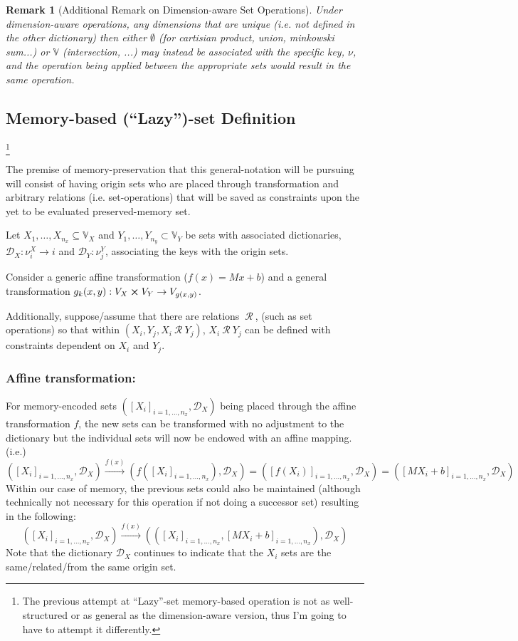 \documentclass[11pt]{article}
\newtheorem{remark}{Remark}
\newcommand{\Rel}{\ \mathcal{R} \ }
\newcommand{\V}{\mathbb{V}} %
\newcommand{\Key}{\nu} %
\newcommand{\Dict}{\mathcal{D}} %
\begin{document}
\begin{remark}[Additional Remark on Dimension-aware Set Operations]
	Under dimension-aware operations, any dimensions that are unique (i.e. not defined in the other dictionary) then either $\emptyset$ (for cartisian product, union, minkowski sum...) or $\V$ (intersection, ...) may instead be associated with the specific key, $\Key$, and the operation being applied between the appropriate sets would result in the same operation.
\end{remark}


\subsection{Memory-based (``Lazy'')-set Definition}
\footnote{The previous attempt at ``Lazy''-set memory-based operation is not as well-structured or as general as the dimension-aware version, thus I'm going to have to attempt it differently.}

The premise of memory-preservation that this general-notation will be pursuing will consist of having origin sets who are placed through transformation and arbitrary relations (i.e. set-operations) that will be saved as constraints upon the yet to be evaluated preserved-memory set.

Let $X_{1},\dots,X_{n_x} \subseteq \V_{X}$ and $Y_{1},\dots,Y_{n_y} \subset \V_{Y}$ be sets with associated dictionaries, $\Dict_{X} : \Key^{X}_{i} \to i$ and $\Dict_{Y} : \Key^{Y}_{j}$, associating the keys with the origin sets.

Consider a generic affine transformation ($f(x) = Mx + b$) and a general transformation $g_{k}(x,y) : V_{X} \cross V_{Y} \to V_{g(x,y)}$.

Additionally, suppose/assume that there are relations $\Rel$, (such as set operations) so that within $(X_{i}, Y_{j}, X_{i} \Rel Y_{j})$, $X_{i} \Rel Y_{j}$ can be defined with constraints dependent on $X_{i}$ and $Y_{j}$.

\subsubsection{Affine transformation:}
For memory-encoded sets $([X_{i}]_{i=1,\dots,n_x},\Dict_{X})$ being placed through the affine transformation $f$, the new sets can be transformed with no adjustment to the dictionary but the individual sets will now be endowed with an affine mapping.
(i.e.)\[
	([X_{i}]_{i=1,\dots,n_x},\Dict_{X}) 
	\overset{f(x)}{\rightarrow} 
	(f([X_{i}]_{i=1,\dots,n_x}),\Dict_{X})
	= ([f(X_{i})]_{i=1,\dots,n_x},\Dict_{X})
	= ([M X_{i} + b]_{i=1,\dots,n_x},\Dict_{X})
\]
Within our case of memory, the previous sets could also be maintained (although technically not necessary for this operation if not doing a successor set) resulting in the following:
\[
	([X_{i}]_{i=1,\dots,n_x},\Dict_{X}) 
	\overset{f(x)}{\rightarrow} 
	(([X_{i}]_{i=1,\dots,n_x}, [M X_{i} + b]_{i=1,\dots,n_x}),\Dict_{X}) 
\]
Note that the dictionary $\Dict_{X}$ continues to indicate that the $X_{i}$ sets are the same/related/from the same origin set.
\end{document}
